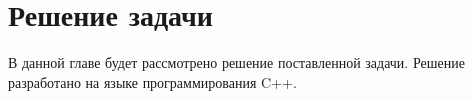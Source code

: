 \section{Решение задачи}

В данной главе будет рассмотрено решение поставленной задачи. Решение разработано на языке программирования C++.











\clearpage
